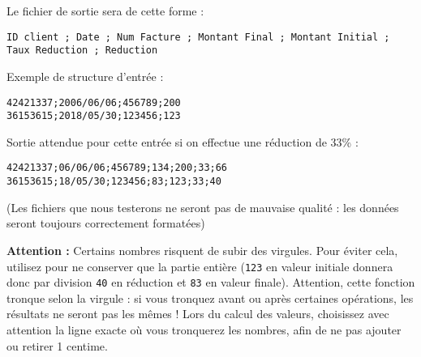 %
%

\bigskip

\noindent Le fichier de sortie sera de cette forme : \\

\lstset{language=sh,basicstyle=\ttfamily \footnotesize}
\begin{lstlisting}[frame=single,title={Sortie attendue}]
ID client ; Date ; Num Facture ; Montant Final ; Montant Initial ; Taux Reduction ; Reduction
\end{lstlisting}

\newpage

\noindent Exemple de structure d'entrée :

\lstset{language=sh}
\begin{lstlisting}[frame=single,title={Exemple de données en entrée}]
42421337;2006/06/06;456789;200
36153615;2018/05/30;123456;123
\end{lstlisting}

\bigskip

\noindent Sortie attendue pour cette entrée si on effectue une réduction de 33\% :

\lstset{language=sh}
\begin{lstlisting}[frame=single,title={Sortie attendue pour l'entrée précédente avec 33\% de réduction}]
42421337;06/06/06;456789;134;200;33;66
36153615;18/05/30;123456;83;123;33;40
\end{lstlisting}

\bigskip

\noindent (Les fichiers que nous testerons ne seront pas de mauvaise qualité : les données seront toujours correctement formatées)

\bigskip

\begin{YellowBox}
\textbf{Attention :} Certains nombres risquent de subir des virgules.
Pour éviter cela, utilisez  pour ne conserver que la partie entière (\texttt{123} en valeur initiale donnera donc par division \texttt{40} en réduction et \texttt{83} en valeur finale).
Attention, cette fonction tronque selon la virgule : si vous tronquez avant ou après certaines opérations, les résultats ne seront pas les mêmes !
Lors du calcul des valeurs, choisissez avec attention la ligne exacte où vous tronquerez les nombres, afin de ne pas ajouter ou retirer 1 centime.
\end{YellowBox}

